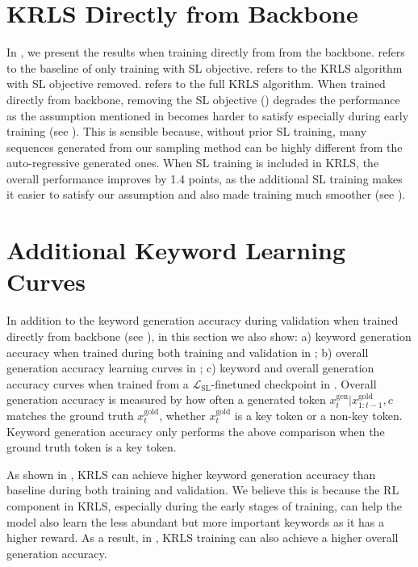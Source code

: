 \section{KRLS Directly from Backbone}
\label{sec:Training KRLS from Scratch}

In , we present the results when training directly from from the backbone.  refers to the baseline of only training with SL objective.  refers to the KRLS algorithm with SL objective removed.  refers to the full KRLS algorithm. When trained directly from backbone, removing the SL objective () degrades the performance as the assumption mentioned in  becomes harder to satisfy especially during early training (see ). This is sensible because, without prior SL training, many sequences generated from our sampling method can be highly different from the auto-regressive generated ones. When SL training is included in KRLS, the overall performance improves by 1.4 points, as the additional SL training makes it easier to satisfy our assumption and also made training much smoother (see ).
\section{Additional Keyword Learning Curves}
\label{sec:Additional Keyword Learning Curves}

In addition to the keyword generation accuracy during validation when trained directly from backbone (see ), in this section we also show: a) keyword generation accuracy when trained during both training and validation in ; b) overall generation accuracy learning curves in ; c) keyword and overall generation accuracy curves when trained from a $\mathcal{L}_{\mathrm{SL}}$-finetuned checkpoint in . 
Overall generation accuracy is measured by how often a generated token $x_t^{\mathrm{gen}}|x^{\mathrm{gold}}_{1:t-1},c$ matches the ground truth $x_t^{\mathrm{gold}}$, whether $x_t^{\mathrm{gold}}$ is a key token or a non-key token. Keyword generation accuracy only performs the above comparison when the ground truth token is a key token. 

As shown in , KRLS can achieve higher keyword generation accuracy than baseline during both training and validation. We believe this is because the RL component in KRLS, especially during the early stages of training, can help the model also learn the less abundant but more important keywords as it has a higher reward. As a result, in , KRLS training can also achieve a higher overall generation accuracy.

